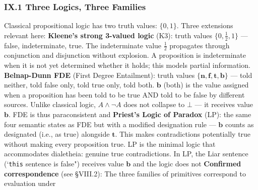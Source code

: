 \documentclass[12pt,a4paper]{article}
\begin{document}
\subsubsection{IX.1 Three Logics, Three Families}
Classical propositional logic has two truth values: $\{0, 1\}$. Three extensions relevant here:
\textbf{Kleene's strong 3-valued logic} (K3): truth values $\{0, \frac{1}{2}, 1\}$ --- false, indeterminate, true. The
indeterminate value $\frac{1}{2}$ propagates through conjunction and disjunction without explosion. A proposition is
indeterminate when it is not yet determined whether it holds; this models partial information.
\textbf{Belnap-Dunn FDE} (First Degree Entailment): truth values $\{\mathbf{n}, \mathbf{f},\mathbf{t}, \mathbf{b}\}$
--- told neither, told false only, told true only, told both. $\mathbf{b}$ (both) is the value assigned when a
proposition has been told to be true AND told to be false by different sources. Unlike classical
logic, $A \wedge \neg A$ does not collapse to $\bot$ --- it receives value $\mathbf{b}$. FDE is thus paraconsistent and
\textbf{Priest's Logic of Paradox} (LP): the same four semantic states as FDE but with a modified designation rule ---
$\mathbf{b}$ counts as designated (i.e., as true) alongside $\mathbf{t}$. This makes contradictions potentially true
without making every proposition true. LP is the minimal logic that accommodates dialetheia: genuine true
contradictions. In LP, the Liar sentence (`\texttt{this} sentence is false") receives value $\mathbf{b}$ and the logic does not
\textbf{Confirmed correspondence} (see \S VIII.2): The three families of primitives correspond to evaluation under
\end{document}
